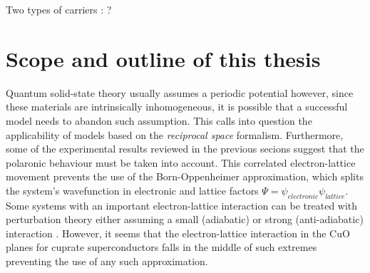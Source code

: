 Two types of carriers \cite{Mihailovic2001}
\cite{Mihailovic2005}: ?

\section{Scope and outline of this thesis}
\label{sec:scope}



Quantum solid-state theory usually assumes a periodic potential however, since these materials are intrinsically inhomogeneous, it is possible that a successful model needs to abandon such assumption. 
This calls into question the applicability of models based on the \textit{reciprocal space} formalism.
Furthermore, some of the experimental results reviewed in the previous secions suggest that the polaronic behaviour must be taken into account.
This correlated electron-lattice movement prevents the use of the Born-Oppenheimer approximation, which splits the system's wavefunction in electronic and lattice factors $\Psi = \psi_{electronic}\psi_{lattice}$.
Some systems with an important electron-lattice interaction can be treated with perturbation theory either assuming a small (adiabatic) or strong (anti-adiabatic) interaction \cite{?}. 
However, it seems that the electron-lattice interaction in the CuO planes for cuprate superconductors falls in the middle of such extremes \cite{MustredeLeon1992} preventing the use of any such approximation.

